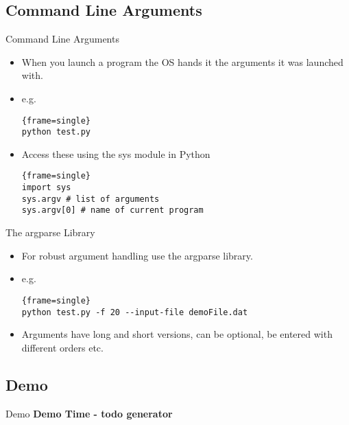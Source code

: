 \documentclass{beamer}
\begin{document}
\subsection{Command Line Arguments}
\begin{frame}[fragile]{Command Line Arguments}
	\begin{itemize}
	\item {When you launch a program the OS hands it the arguments it was launched with.
	} 
	\pause
	\item{ e.g.
\begin{block}{}
\begin{lstlisting}{frame=single}
python test.py
\end{lstlisting}
\end{block}}
\pause
\item {Access these using the sys module in Python
\begin{block}{}
\begin{lstlisting}{frame=single}
import sys
sys.argv # list of arguments 
sys.argv[0] # name of current program
\end{lstlisting}
\end{block}}
\end{itemize}
\end{frame}
\begin{frame}[fragile]{The argparse Library}
	\begin{itemize}
	\item {For robust argument handling use the argparse library. } 
	\pause
	\item{ e.g.
\begin{block}{}
\begin{lstlisting}{frame=single}
python test.py -f 20 --input-file demoFile.dat
\end{lstlisting}
\end{block}}
	\pause
	\item {Arguments have long and short versions, can be optional, be entered with different orders etc.} 
\end{itemize}
\end{frame}


\subsection{Demo}
\begin{frame}[fragile]{Demo}
	 \huge{\textbf{Demo Time - todo generator}}
\end{frame}
\end{document}
